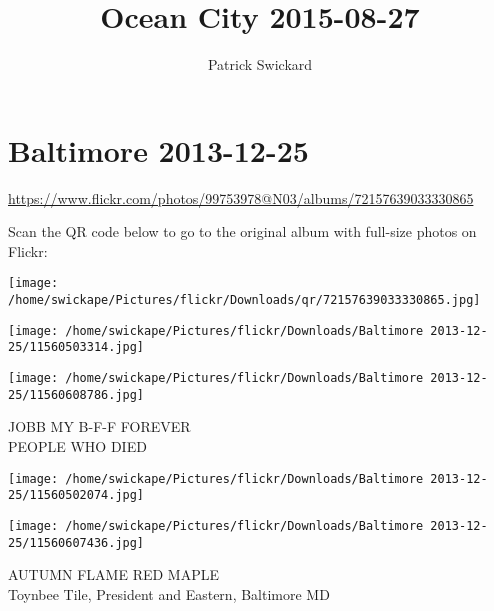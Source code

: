\documentclass[10pt,letterpaper]{article}
\title{Ocean City 2015-08-27}
\author{Patrick Swickard}
\date{}
\begin{document}
\section*{Baltimore 2013-12-25}

\url{https://www.flickr.com/photos/99753978@N03/albums/72157639033330865}

Scan the QR code below to go to the original album with full-size photos on Flickr:

\texttt{[image: /home/swickape/Pictures/flickr/Downloads/qr/72157639033330865.jpg]}
\pagebreak

\texttt{[image: /home/swickape/Pictures/flickr/Downloads/Baltimore 2013-12-25/11560503314.jpg]}

\vspace{0.25in}
\texttt{[image: /home/swickape/Pictures/flickr/Downloads/Baltimore 2013-12-25/11560608786.jpg]}

JOBB MY B{-}F{-}F FOREVER\\
PEOPLE WHO DIED
\pagebreak

\texttt{[image: /home/swickape/Pictures/flickr/Downloads/Baltimore 2013-12-25/11560502074.jpg]}

\vspace{0.25in}
\texttt{[image: /home/swickape/Pictures/flickr/Downloads/Baltimore 2013-12-25/11560607436.jpg]}

AUTUMN FLAME RED MAPLE\\
Toynbee Tile, President and Eastern, Baltimore MD
\pagebreak
\end{document}
